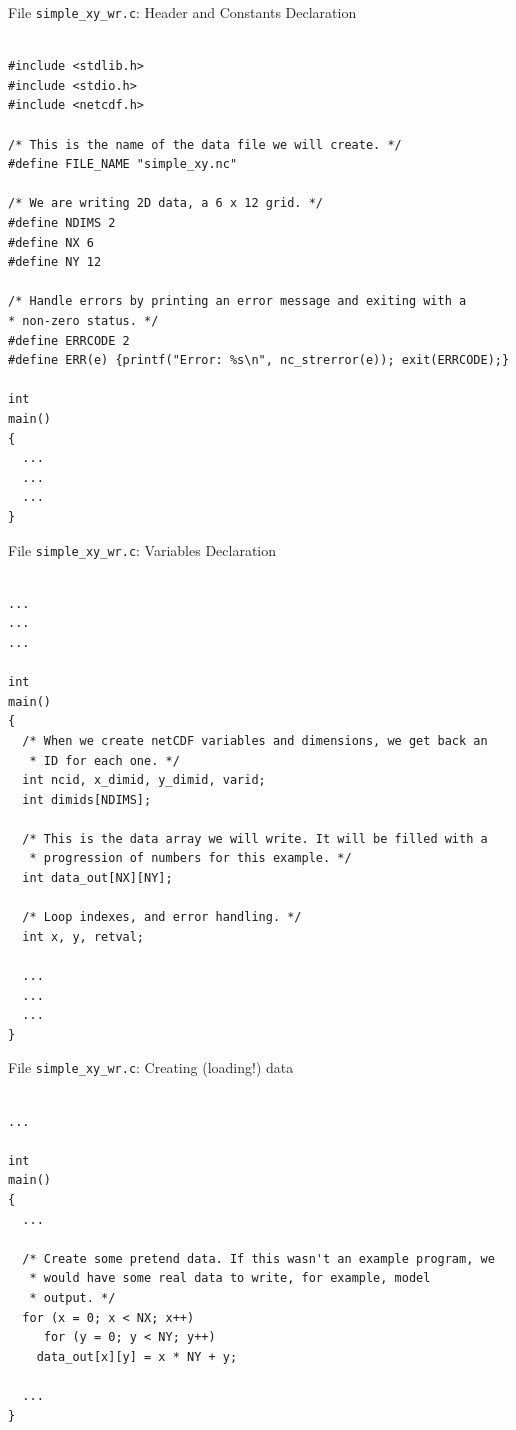 \documentclass[compress,11pt,xcolor=svgnames,aspectratio=169]{beamer}
\begin{document}
\begin{frame}[fragile]{File \texttt{simple\_xy\_wr.c}: Header and Constants Declaration}

\tiny{

\begin{verbatim}

#include <stdlib.h>
#include <stdio.h>
#include <netcdf.h>

/* This is the name of the data file we will create. */
#define FILE_NAME "simple_xy.nc"

/* We are writing 2D data, a 6 x 12 grid. */
#define NDIMS 2
#define NX 6
#define NY 12

/* Handle errors by printing an error message and exiting with a
* non-zero status. */
#define ERRCODE 2
#define ERR(e) {printf("Error: %s\n", nc_strerror(e)); exit(ERRCODE);}

int
main()
{
  ...
  ...
  ...
}

\end{verbatim}

}

\end{frame}

\begin{frame}[fragile]{File \texttt{simple\_xy\_wr.c}: Variables Declaration}

\tiny{

\begin{verbatim}

...
...
...

int
main()
{
  /* When we create netCDF variables and dimensions, we get back an
   * ID for each one. */
  int ncid, x_dimid, y_dimid, varid;
  int dimids[NDIMS];

  /* This is the data array we will write. It will be filled with a
   * progression of numbers for this example. */
  int data_out[NX][NY];

  /* Loop indexes, and error handling. */
  int x, y, retval;

  ...
  ...
  ...
}

\end{verbatim}

}

\end{frame}

\begin{frame}[fragile]{File \texttt{simple\_xy\_wr.c}: Creating (loading!) data}

\tiny{

\begin{verbatim}

...

int
main()
{
  ...

  /* Create some pretend data. If this wasn't an example program, we
   * would have some real data to write, for example, model
   * output. */
  for (x = 0; x < NX; x++)
     for (y = 0; y < NY; y++)
    data_out[x][y] = x * NY + y;

  ...
}

\end{verbatim}

}

\end{frame}
\end{document}
